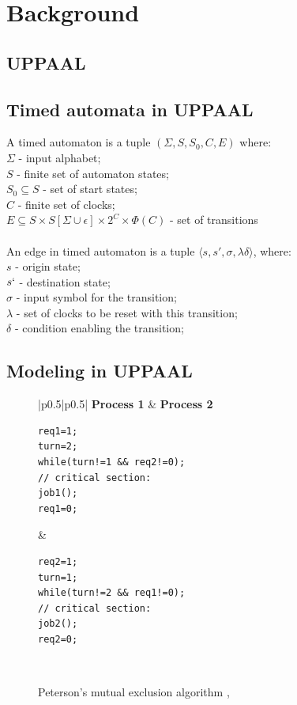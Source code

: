 \section{Background}

\subsection{UPPAAL}



\subsection{Timed automata in UPPAAL}
\begin{definition}
A timed automaton is a tuple $(\Sigma, S, S_0, C, E)$ where:\\
$\Sigma$ - input alphabet;\\
$S$ - finite set of automaton states;\\
$S_0 \subseteq S$ - set of start states; \\
$C$ - finite set of clocks; \\
$E \subseteq S \times S [\Sigma \cup {\epsilon}] \times 2^C \times \Phi(C)$ - set of transitions\\\\
An edge in timed automaton is a tuple $\langle s, s', \sigma, \lambda \delta \rangle$, where:\\
$s$ - origin state;\\
$s`$ - destination state;\\
$\sigma$ - input symbol for the transition;\\
$\lambda$ - set of clocks to be reset with this transition;\\
$\delta$ - condition enabling the transition;\\
\label{def:automaton}
\end{definition}


\subsection{Modeling in UPPAAL}


\begin{figure}[H]
\caption{Peterson’s mutual exclusion algorithm 
\label{fig:mutex_code}
\cite{SmallTutorial2009}, \cite{Peterson1981}}
\begin{tabular}{|p{}|p{}|}
\hline
\textbf{Process 1} & \textbf{Process 2} \\
\hline
\begin{lstlisting}[basicstyle=\ttfamily]
req1=1;
turn=2;
while(turn!=1 && req2!=0);
// critical section:
job1();
req1=0;
\end{lstlisting}
&
\begin{lstlisting}[basicstyle=\ttfamily]
req2=1;
turn=1;
while(turn!=2 && req1!=0);
// critical section:
job2();
req2=0;
\end{lstlisting}
\\
\hline
\end{tabular}
\end{figure}


